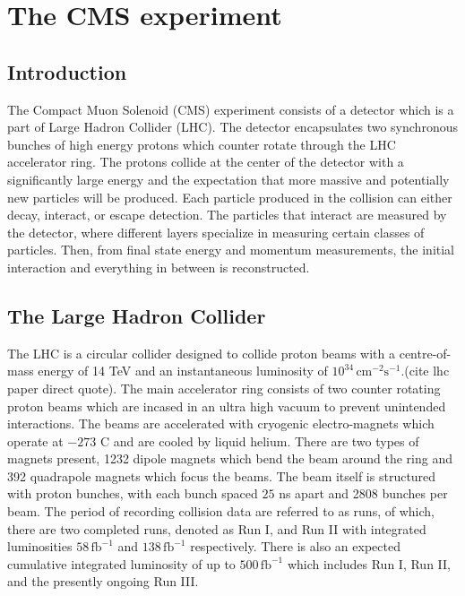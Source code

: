 \setcounter{secnumdepth}{3}
\setcounter{tocdepth}{3}
\setlength{\parskip}{\smallskipamount}
\setlength{\parindent}{0pt}


\makeatletter


\providecommand{\tabularnewline}{\\}


\makeatother


\chapter{The CMS experiment}

\section{Introduction} The Compact Muon Solenoid (CMS) experiment consists of a detector which is a part of Large Hadron Collider (LHC). The detector encapsulates two synchronous bunches of high energy protons  which counter rotate through the LHC accelerator ring.  The protons collide at the center of the detector with a significantly large energy and the expectation that more massive and potentially new particles will be produced. Each particle produced in the collision can either decay, interact, or escape detection. The particles that interact are measured by the detector, where different layers specialize in measuring certain classes of particles. Then, from final state energy and momentum measurements, the initial interaction and everything in between is reconstructed.   



\section{The Large Hadron Collider}
The LHC is a circular collider designed to collide proton beams with a centre-of-mass energy of 14 TeV and an instantaneous luminosity of $10^{34} \, \text{cm}^{-2}\text{s}^{-1}$.(cite lhc paper direct quote). The main accelerator ring consists of two counter rotating proton beams which are incased in an ultra high vacuum to prevent unintended interactions. The beams are accelerated with cryogenic electro-magnets which operate at $-273$ C and are cooled by liquid helium. There are two types of magnets present, 1232 dipole magnets which bend the beam around the ring and 392 quadrapole magnets which focus the beams.  The beam itself is structured with proton bunches, with each bunch spaced $25$ ns apart and 2808 bunches per beam. The period of recording collision data are referred to as runs, of which, there are two completed runs, denoted as Run I, and Run II with integrated luminosities $58 \, \text{fb}^{-1}$ and $138\, \text{fb}^{-1}$ respectively. There is also an expected cumulative integrated luminosity of up to $500 \,\text{fb}^{-1}$ which includes Run I, Run II, and the presently ongoing Run III.  

